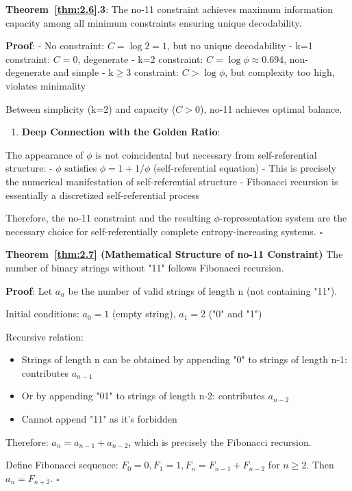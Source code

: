    \textbf{Theorem~\ref{thm:2.6}.3}: The no-11 constraint achieves maximum information capacity among all minimum constraints ensuring unique decodability.
\label{thm:2.6}
   
   \textbf{Proof}:
   - No constraint: $C = \log 2 = 1$, but no unique decodability
   - k=1 constraint: $C = 0$, degenerate
   - k=2 constraint: $C = \log \phi \approx 0.694$, non-degenerate and simple
   - k$\geq$3 constraint: $C > \log \phi$, but complexity too high, violates minimality
   
   Between simplicity (k=2) and capacity ($C > 0$), no-11 achieves optimal balance.

\begin{enumerate}
\item \textbf{Deep Connection with the Golden Ratio}:
\end{enumerate}
   
   The appearance of $\phi$ is not coincidental but necessary from self-referential structure:
   - $\phi$ satisfies $\phi = 1 + 1/\phi$ (self-referential equation)
   - This is precisely the numerical manifestation of self-referential structure
   - Fibonacci recursion is essentially a discretized self-referential process

Therefore, the no-11 constraint and the resulting $\phi$-representation system are the necessary choice for self-referentially complete entropy-increasing systems. $\square$

\textbf{Theorem~\ref{thm:2.7} (Mathematical Structure of no-11 Constraint)}
\label{thm:2.7}
The number of binary strings without "11" follows Fibonacci recursion.

\textbf{Proof}:
Let $a_n$ be the number of valid strings of length n (not containing "11").

Initial conditions: $a_0 = 1$ (empty string), $a_1 = 2$ ("0" and "1")

Recursive relation:
\begin{itemize}
\item Strings of length n can be obtained by appending "0" to strings of length n-1: contributes $a_{n-1}$
\item Or by appending "01" to strings of length n-2: contributes $a_{n-2}$
\item Cannot append "11" as it's forbidden
\end{itemize}

Therefore: $a_n = a_{n-1} + a_{n-2}$, which is precisely the Fibonacci recursion.

Define Fibonacci sequence: $F_0 = 0, F_1 = 1, F_n = F_{n-1} + F_{n-2}$ for $n \geq 2$.
Then $a_n = F_{n+2}$. $\square$

